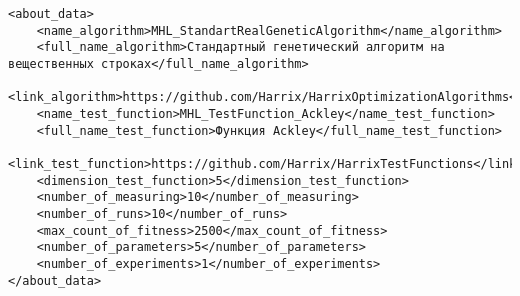 \documentclass[a4paper,12pt]{article}
\begin{document}
\begin{lstlisting}[label=Part07,caption=Подблок без комментариев в файле Harrix Optimization Testing]
<about_data>
	<name_algorithm>MHL_StandartRealGeneticAlgorithm</name_algorithm>
	<full_name_algorithm>Стандартный генетический алгоритм на вещественных строках</full_name_algorithm>
	<link_algorithm>https://github.com/Harrix/HarrixOptimizationAlgorithms</link_algorithm>
	<name_test_function>MHL_TestFunction_Ackley</name_test_function>
	<full_name_test_function>Функция Ackley</full_name_test_function>
	<link_test_function>https://github.com/Harrix/HarrixTestFunctions</link_test_function>
	<dimension_test_function>5</dimension_test_function>
	<number_of_measuring>10</number_of_measuring>
	<number_of_runs>10</number_of_runs>
	<max_count_of_fitness>2500</max_count_of_fitness>
	<number_of_parameters>5</number_of_parameters>
	<number_of_experiments>1</number_of_experiments>
</about_data>
\end{lstlisting}
\end{document}
